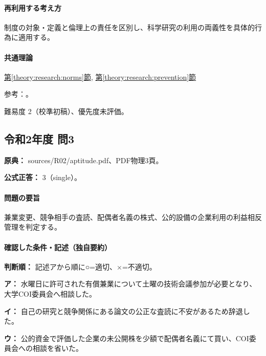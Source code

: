 \paragraph{再利用する考え方} 制度の対象・定義と倫理上の責任を区別し、科学研究の利用の両義性を具体的行為に適用する。

\paragraph{共通理論} \hyperref[theory:research:norms]{第\ref*{theory:research:norms}節}, \hyperref[theory:research:prevention]{第\ref*{theory:research:prevention}節}

\par 参考：\cite{scj_code2013}。

\par 難易度 2（校準初稿）、優先度未評価。

\subsection{令和2年度 問3}
\label{q:r02-reg-apt-03}

\noindent\textbf{原典：} sources/R02/aptitude.pdf、PDF物理3頁。

\textbf{公式正答：} 3（single）。

\paragraph{問題の要旨} 兼業変更、競争相手の査読、配偶者名義の株式、公的設備の企業利用の利益相反管理を判定する。

\paragraph{確認した条件・記述（独自要約）}\mbox{}\par

\noindent\textbf{判断順：} 記述アから順に○=適切、×=不適切。\par

\noindent\textbf{ア：} 水曜日に許可された有償兼業について土曜の技術会議参加が必要となり、大学COI委員会へ相談した。\par

\noindent\textbf{イ：} 自己の研究と競争関係にある論文の公正な査読に不安があるため辞退した。\par

\noindent\textbf{ウ：} 公的資金で評価した企業の未公開株を少額で配偶者名義にて買い、COI委員会への相談を省いた。\par

